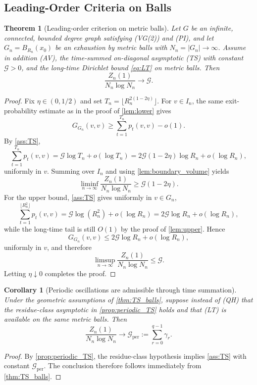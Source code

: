 \documentclass[reqno]{amsart}
\numberwithin{equation}{section}
\newtheorem{theorem}{Theorem}[section]
\newtheorem{corollary}[corollary]{Corollary}
\theoremstyle{definition}
\theoremstyle{remark}
\newcommand{\Cref}[1]{\autoref{#1}}
\newcommand{\cG}{\mathcal{G}}
\begin{document}
\subsection{Leading-Order Criteria on Balls}

\begin{theorem}[Leading-order criterion on metric balls]\label{thm:TS_balls}
Let $G$ be an infinite, connected, bounded degree graph satisfying \textup{(VG(2))} and \textup{(PI)}, and let $G_n=B_{R_n}(x_0)$ be an exhaustion by metric balls with $N_n=|G_n|\to\infty$. Assume in addition \textup{(AV)}, the time-summed on-diagonal asymptotic \textup{(TS)} with constant $\cG>0$, and the long-time Dirichlet bound \eqref{eq:LT} on metric balls. Then
\[
  \frac{Z_n(1)}{N_n\log N_n}\longrightarrow \cG.
\]
\end{theorem}

\begin{proof}
Fix $\eta\in(0,1/2)$ and set $T_n=\lfloor R_n^{2(1-2\eta)}\rfloor$. For $v\in I_n$, the same exit-probability estimate as in the proof of \Cref{lem:lower} gives
\[
  G_{G_n}(v,v)\ge \sum_{t=1}^{T_n}p_t(v,v)-o(1).
\]
By \Cref{ass:TS},
\[
  \sum_{t=1}^{T_n}p_t(v,v)=\cG\log T_n+o(\log T_n)
  =2\cG(1-2\eta)\log R_n+o(\log R_n),
\]
uniformly in $v$. Summing over $I_n$ and using \Cref{lem:boundary_volume} yields
\[
  \liminf_{n\to\infty}\frac{Z_n(1)}{N_n\log N_n}\ge \cG(1-2\eta).
\]
For the upper bound, \Cref{ass:TS} gives uniformly in $v\in G_n$,
\[
  \sum_{t=1}^{\lfloor R_n^2\rfloor} p_t(v,v)=\cG\log(R_n^2)+o(\log R_n)=2\cG\log R_n+o(\log R_n),
\]
while the long-time tail is still $O(1)$ by the proof of \Cref{lem:upper}. Hence
\[
  G_{G_n}(v,v)\le 2\cG\log R_n+o(\log R_n),
\]
uniformly in $v$, and therefore
\[
  \limsup_{n\to\infty}\frac{Z_n(1)}{N_n\log N_n}\le \cG.
\]
Letting $\eta\downarrow 0$ completes the proof.
\end{proof}

\begin{corollary}[Periodic oscillations are admissible through time summation]\label{cor:periodic_balls}
Under the geometric assumptions of \Cref{thm:TS_balls}, suppose instead of \textup{(QH)} that the residue-class asymptotic in \Cref{prop:periodic_TS} holds and that \textup{(LT)} is available on the same metric balls. Then
\[
  \frac{Z_n(1)}{N_n\log N_n}\longrightarrow \cG_{\mathrm{per}}
  :=\sum_{r=0}^{q-1}\gamma_r.
\]
\end{corollary}

\begin{proof}
By \Cref{prop:periodic_TS}, the residue-class hypothesis implies \Cref{ass:TS} with constant $\cG_{\mathrm{per}}$. The conclusion therefore follows immediately from \Cref{thm:TS_balls}.
\end{proof}
\end{document}

